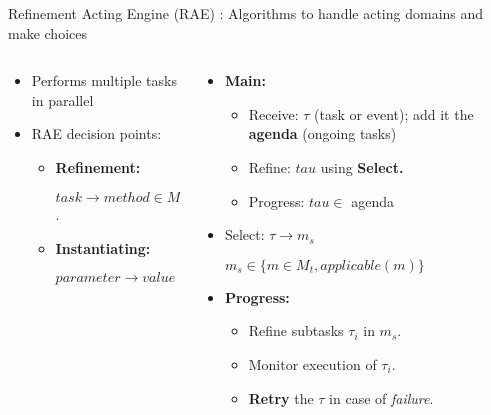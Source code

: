\begin{frame}{Refinement Acting Engine (RAE)\cite{ghallabAutomatedPlanningActing2016} : Algorithms to handle acting domains and make choices}
\begin{columns}
    \begin{column}{0.35\textwidth}
    \pause
    \setlength{\leftmargini}{-1pt}
    \begin{itemize}
        \item Performs multiple tasks in parallel
        \pause
        \item RAE decision points:
        \begin{itemize}
            \pause
            \item \textbf{Refinement:}
            
            $task \rightarrow  method \in M_t$.
            \pause
            \item \textbf{Instantiating:}
            
            $parameter \rightarrow value \in D_p$
        \end{itemize}
    \end{itemize}
    \end{column}
    \begin{column}{0.65\textwidth}
        \begin{itemize}
            \setlength{\leftmargini}{-1pt}
            \item \textbf{Main:} 
            \begin{itemize}
                \item Receive:  $\tau$ (task or event);
                add it the \textbf{agenda} ({ongoing tasks})
                \pause
                \item Refine: $tau$ using \textbf{Select.}
                \pause
                \item Progress: $tau \in$ agenda
            \end{itemize}
            \pause
            \item Select: $\tau \rightarrow m_s$
            
            $ m_s \in \{m \in M_t, applicable(m)\}$
            \pause
            \item \textbf{Progress:}
                \begin{itemize}
                \item Refine subtasks $\tau_i$ in $m_s$.    
                \item Monitor execution of $\tau_i$.
                \item \textbf{Retry} the $\tau$ in case of \emph{failure}.
                \end{itemize}
                \pause
            

\end{itemize}
\end{column}
\end{columns}
\end{frame}
